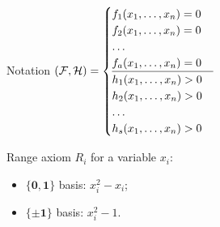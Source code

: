 \begin{frame}{Notation}
    $(\mathcal{F}, \mathcal{H}) =
    \begin{cases}
        f_1(x_1, \dots, x_n) = 0 \\
        f_2(x_1, \dots, x_n) = 0 \\
        \dots \\
        f_a(x_1, \dots, x_n) = 0 \\
        \hline
        h_1(x_1, \dots, x_n) > 0 \\
        h_2(x_1, \dots, x_n) > 0 \\
        \dots \\
        h_s(x_1, \dots, x_n) > 0 \\
    \end{cases}
    $

    \pause

    \begin{block}{Range axiom $R_i$ for a variable $x_i$:}
        \begin{itemize}
            \item $\mathbf{\{0, 1\}}$ basis: $x_i^2 - x_i$;
            \item $\mathbf{\{\pm 1\}}$ basis: $x_i^2 - 1$.
        \end{itemize}
    \end{block}

   
\end{frame}



